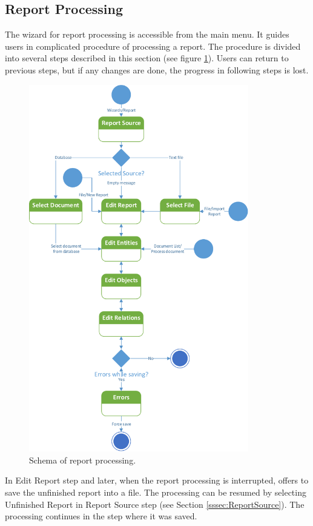 \subsection{Report Processing}
\label{ssec:ProcessReport}

The wizard for report processing is accessible from the main menu. It guides
users in complicated procedure of processing a report. The procedure is divided
into several steps described in this section (see figure \ref{fig:Pipeline}).
Users can return to previous steps, but if any changes are done, the progress
in following steps is lost.

\begin{figure}[!htb]
        \centering
        \includegraphics[height=16cm,keepaspectratio]{Images/pipeline}
        \caption{Schema of report processing.}
        \label{fig:Pipeline}
\end{figure}

In Edit Report step and later, when the report processing is interrupted,
\textan{} offers to save the unfinished report into a file. The processing can
be resumed by selecting Unfinished Report in Report Source step (see Section
\ref{sssec:ReportSource}). The processing continues in the step where it was
saved.

